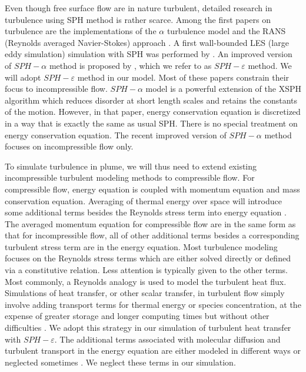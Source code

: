 \documentclass[journal abbreviation, manuscript]{copernicus}
\begin{document}
Even though free surface flow are in nature turbulent, detailed research in turbulence using SPH method is rather scarce. Among the first papers on turbulence are the implementations of the $\alpha$ turbulence model \citep{holm1999fluctuation, monaghan2002sph} and the RANS (Reynolds averaged Navier-Stokes) approach \citep{violeau2007numerical}. A first wall-bounded LES (large eddy simulation) simulation with SPH was performed by \citet{issa2005numerical}. An improved version of $SPH-\alpha$ method is proposed by \citet{monaghan2011turbulence}, which we refer to as $SPH-\varepsilon$ method. We will adopt $SPH-\varepsilon$ method in our model. Most of these papers constrain their focus to incompressible flow. $SPH-\alpha$ model \citep{monaghan2002sph} is a powerful extension of the XSPH algorithm which reduces disorder at short length scales and retains the constants of the motion. However, in that paper, energy conservation equation is discretized in a way that is exactly the same as usual SPH. There is no special treatment on energy conservation equation. The recent improved version \citep{monaghan2011turbulence} of $SPH-\alpha$ method focuses on incompressible flow only.
 
To simulate turbulence in plume, we will thus need to extend existing incompressible turbulent modeling methods to compressible flow. For compressible flow, energy equation is coupled with momentum equation and mass conservation equation. Averaging of thermal energy over space will introduce some additional terms besides the Reynolds stress term into energy equation \citep{NASACompressibleTurbulence}. The averaged momentum equation for compressible flow are in the same form as that for incompressible flow, all of other additional terms besides a corresponding turbulent stress term are in the energy equation. Most turbulence modeling focuses on the Reynolds stress terms which are either solved directly or defined via a constitutive relation. Less attention is typically given to the other terms. Most commonly, a Reynolds analogy is used to model the turbulent heat flux. Simulations of heat transfer, or other scalar transfer, in turbulent flow simply involve adding transport terms for thermal energy or species concentration, at the expense of greater storage and longer computing times but without other difficulties \citep{cebeci2013analysis}. We adopt this strategy in our simulation of turbulent heat transfer with $SPH-\varepsilon$. %
The additional terms associated with molecular diffusion and turbulent transport in the energy equation are either modeled in different ways or neglected sometimes \citep{NASACompressibleTurbulence}. We neglect these terms in our simulation.
\end{document}
